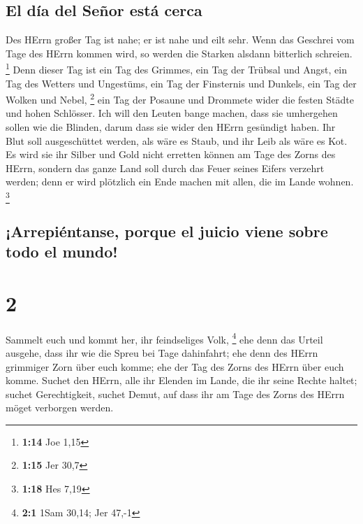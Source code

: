 \hypertarget{el-duxeda-del-seuxf1or-estuxe1-cerca}{%
\subsection{El día del Señor está
cerca}\label{el-duxeda-del-seuxf1or-estuxe1-cerca}}

 Des HErrn großer Tag ist nahe; er ist nahe und eilt
sehr. Wenn das Geschrei vom Tage des HErrn kommen wird, so werden die
Starken alsdann bitterlich schreien. \footnote{\textbf{1:14} Joe 1,15}
 Denn dieser Tag ist ein Tag des Grimmes, ein Tag der
Trübsal und Angst, ein Tag des Wetters und Ungestüms, ein Tag der
Finsternis und Dunkels, ein Tag der Wolken und Nebel, \footnote{\textbf{1:15}
  Jer 30,7}  ein Tag der Posaune und Drommete wider die
festen Städte und hohen Schlösser.  Ich will den Leuten
bange machen, dass sie umhergehen sollen wie die Blinden, darum dass sie
wider den HErrn gesündigt haben. Ihr Blut soll ausgeschüttet werden, als
wäre es Staub, und ihr Leib als wäre es Kot.  Es wird sie
ihr Silber und Gold nicht erretten können am Tage des Zorns des HErrn,
sondern das ganze Land soll durch das Feuer seines Eifers verzehrt
werden; denn er wird plötzlich ein Ende machen mit allen, die im Lande
wohnen. \footnote{\textbf{1:18} Hes 7,19}

\hypertarget{arrepiuxe9ntanse-porque-el-juicio-viene-sobre-todo-el-mundo}{%
\subsection{¡Arrepiéntanse, porque el juicio viene sobre todo el
mundo!}\label{arrepiuxe9ntanse-porque-el-juicio-viene-sobre-todo-el-mundo}}

\hypertarget{section-1}{%
\section{2}\label{section-1}}

 Sammelt euch und kommt her, ihr feindseliges Volk,
\footnote{\textbf{2:1} 1Sam 30,14; Jer 47,-1}  ehe denn
das Urteil ausgehe, dass ihr wie die Spreu bei Tage dahinfahrt; ehe denn
des HErrn grimmiger Zorn über euch komme; ehe der Tag des Zorns des
HErrn über euch komme.  Suchet den HErrn, alle ihr Elenden
im Lande, die ihr seine Rechte haltet; suchet Gerechtigkeit, suchet
Demut, auf dass ihr am Tage des Zorns des HErrn möget verborgen werden.


